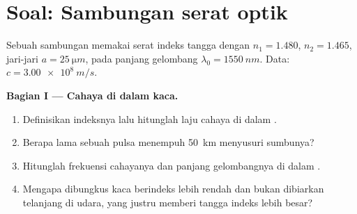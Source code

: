 \section{Soal: Sambungan serat optik}

\begin{problem}
\label{pb:b1:rays-reflection-refraction:1}
Sebuah sambungan memakai serat indeks tangga dengan  $n_1 = 1.480$,
 $n_2 = 1.465$, jari-jari  $a = \qty{25}{\micro m}$, pada
panjang gelombang $\lambda_0 = \qty{1550}{nm}$. Data: $c = \qty{3.00e8}{m/s}$.

\medskip
\noindent\textbf{Bagian I --- Cahaya di dalam kaca.}
\begin{enumerate}
  \item Definisikan indeksnya lalu hitunglah laju cahaya di dalam .
  \item Berapa lama sebuah pulsa menempuh \qty{50}{km} menyusuri
        sumbunya?
  \item Hitunglah frekuensi cahayanya dan panjang gelombangnya di dalam
        .
  \item Mengapa  dibungkus kaca berindeks lebih rendah dan bukan
        dibiarkan telanjang di udara, yang justru memberi tangga indeks
        lebih besar?
\end{enumerate}


\end{problem}
